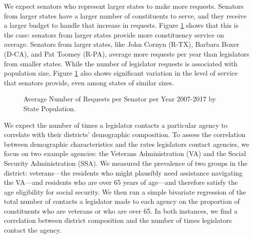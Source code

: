 \documentclass[12pt]{article}
\begin{document}
We expect senators who represent larger states to make more requests. Senators from larger states have a larger number of constituents to serve, and they receive a larger budget to handle that increase in requests.
Figure \ref{f:stateSize} shows that this is the case: senators from larger states provide more constituency service on average. Senators from larger states, like John Cornyn (R-TX), Barbara Boxer (D-CA), and Pat Toomey (R-PA), average more requests per year than legislators from smaller states. While the number of legislator requests is associated with population size, Figure \ref{f:stateSize} also shows significant variation in the level of service that senators provide, even among states of similar sizes.  

\begin{figure}
\centering
\caption{Average Number of Requests per Senator per Year 2007-2017 by State Population.} \label{f:stateSize}
\end{figure}

We expect the number of times a legislator contacts a particular agency to correlate with their districts' demographic composition. To assess the correlation between demographic characteristics and the rates legislators contact agencies, we focus on two example agencies: the Veterans Administration (VA) and the Social Security Administration (SSA). We measured the prevalence of two groups in the district: veterans---the residents who might plausibly need assistance navigating the VA---and residents who are over 65 years of age---and therefore satisfy the age eligibility for social security. We then run a simple bivariate regression of the total number of contacts a legislator made to each agency on the proportion of constituents who are veterans or who are over 65.  
In both instances, we find a correlation between district composition and the number of times legislators contact the agency. 
\end{document}
